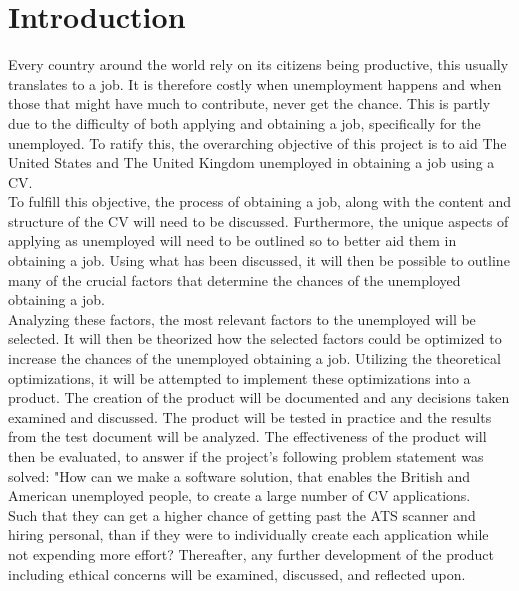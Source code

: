 \section{Introduction}\label{sec:introduction}
Every country around the world rely on its citizens being productive, this usually translates to a job. 
It is therefore costly when unemployment happens and when those that might have much to contribute, never get the chance. 
This is partly due to the difficulty of both applying and obtaining a job, specifically for the unemployed. 
To ratify this, the overarching objective of this project is to aid The United States and The United Kingdom unemployed in obtaining a job using a CV. \\

To fulfill this objective, the process of obtaining a job, along with the content and structure of the CV will need to be discussed.
Furthermore, the unique aspects of applying as unemployed will need to be outlined so to better aid them in obtaining a job.
Using what has been discussed, it will then be possible to outline many of the crucial factors that determine the chances of the unemployed obtaining a job. \\

Analyzing these factors, the most relevant factors to the unemployed will be selected.
It will then be theorized how the selected factors could be optimized to increase the chances of the unemployed obtaining a job. 
Utilizing the theoretical optimizations, it will be attempted to implement these optimizations into a product.
The creation of the product will be documented and any decisions taken examined and discussed. 
The product will be tested in practice and the results from the test document will be analyzed.
The effectiveness of the product will then be evaluated, to answer if the project's following problem statement was solved: "How can we make a software solution, that enables the British and American unemployed people, 
to create a large number of CV applications. \\

Such that they can get a higher chance of getting past the ATS scanner and hiring personal, than
if they were to individually create each application while not expending more effort?
Thereafter, any further development of the product including ethical concerns will be examined, discussed, and reflected upon. \\

\newpage

